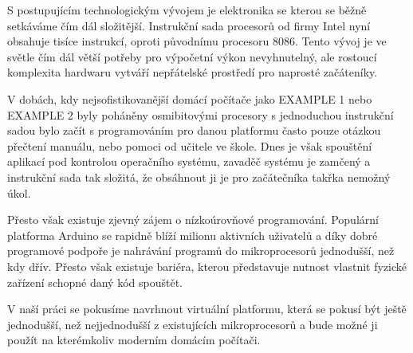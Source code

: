 \begin{introduction}

S postupujícím technologickým vývojem je elektronika se kterou se běžně setkáváme čím dál složitější. Instrukční sada procesorů od firmy Intel nyní obsahuje tisíce instrukcí\cite{x86-instructions}, oproti původnímu procesoru 8086\cite{8086-instructions}. Tento vývoj je ve světle čím dál větší potřeby pro výpočetní výkon nevyhnutelný, ale rostoucí komplexita hardwaru vytváří nepřátelské prostředí pro naprosté začáteníky.

V dobách, kdy nejsofistikovanější domácí počítače jako EXAMPLE 1 nebo EXAMPLE 2 byly poháněny osmibitovými procesory s jednoduchou instrukční sadou bylo začít s programováním pro danou platformu často pouze otázkou přečtení manuálu, nebo pomoci od učitele ve škole. Dnes je však spouštění aplikací pod kontrolou operačního systému, zavaděč systému je zamčený a instrukční sada tak složitá, že obsáhnout ji je pro začátečníka takřka nemožný úkol.

Přesto však existuje zjevný zájem o nízkoúrovňové programování. Populární platforma Arduino se rapidně blíží milionu aktivních uživatelů a díky dobré programové podpoře je nahrávání programů do mikroprocesorů jednodušší, než kdy dřív. Přesto však existuje bariéra, kterou představuje nutnost vlastnit fyzické zařízení schopné daný kód spouštět.

V naší práci se pokusíme navrhnout virtuální platformu, která se pokusí být ještě jednodušší, než nejjednodušší z existujících mikroprocesorů a bude možné ji použít na kterémkoliv moderním domácím počítači.
\end{introduction}
